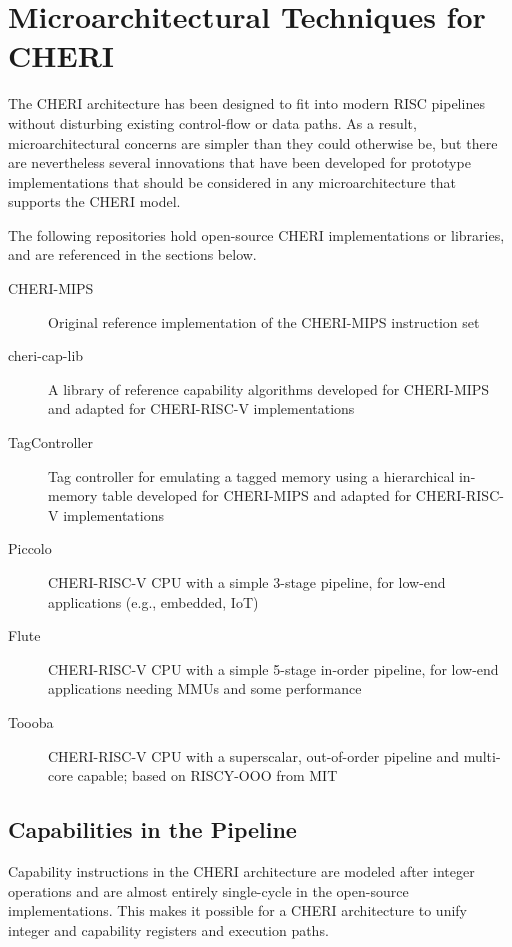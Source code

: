 \chapter{Microarchitectural Techniques for CHERI}
\label{chap:microarchitecture}

The CHERI architecture has been designed to fit into modern RISC pipelines without disturbing existing control-flow or data paths.
As a result, microarchitectural concerns are simpler than they could otherwise be, but there are nevertheless several innovations that have been developed for prototype implementations that should be considered in any microarchitecture that supports the CHERI model.

The following repositories hold open-source CHERI implementations or libraries, and are referenced in the sections below.
\begin{description}
    \item[CHERI-MIPS~\cite{CHERI-cheri-cpu}] Original reference implementation of the CHERI-MIPS instruction set
    \item[cheri-cap-lib~\cite{CHERI-cheri-cap-lib}] A library of reference capability algorithms developed for CHERI-MIPS and adapted for CHERI-RISC-V implementations
    \item[TagController~\cite{CHERI-TagController}] Tag controller for emulating a tagged memory using a hierarchical in-memory table developed for CHERI-MIPS and adapted for CHERI-RISC-V implementations
    \item[Piccolo~\cite{CHERI-Piccolo}] CHERI-RISC-V CPU with a simple 3-stage pipeline, for low-end applications (e.g., embedded, IoT)
    \item[Flute~\cite{CHERI-Flute}] CHERI-RISC-V CPU with a simple 5-stage in-order pipeline, for low-end applications needing MMUs and some performance
    \item[Toooba~\cite{CHERI-Toooba}] CHERI-RISC-V CPU with a superscalar, out-of-order pipeline and multi-core capable; based on RISCY-OOO from MIT
\end{description}

\section{Capabilities in the Pipeline}
Capability instructions in the CHERI architecture are modeled after integer operations and are almost entirely single-cycle in the open-source implementations.
This makes it possible for a CHERI architecture to unify integer and capability registers and execution paths.

